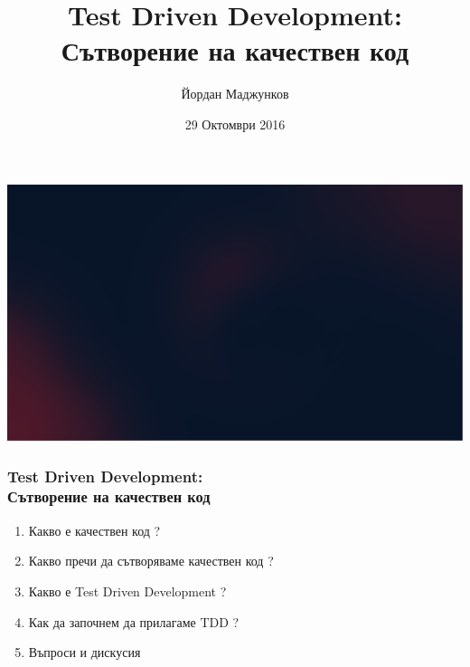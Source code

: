 \documentclass[serif,mathserif,14pt,aspectratio=169]{beamer}
\author[Йордан Маджунков]{Йордан Маджунков}
\title[Test Driven Development\hspace{2em}\insertframenumber/\inserttotalframenumber]{Test Driven Development:\\ Сътворение на качествен код}
\date{29 Октомври 2016} %
\begin{document}
\maketitle

{\includegraphics[width=\paperwidth,height=\paperheight]{background2.jpg}}


\begin{frame}
\frametitle{Test Driven Development:\\ Сътворение на качествен код}
\begin{enumerate} 
    \item Какво е качествен код ?
    \item Какво пречи да сътворяваме качествен код ?
    \item Какво е Test Driven Development ?
    \item Как да започнем да прилагаме TDD ?
    \item Въпроси и дискусия 
\end{enumerate} 
\end{frame}






\end{document}
